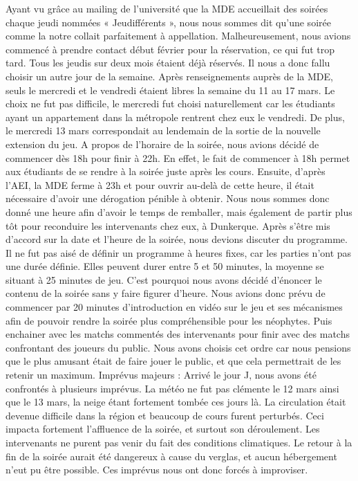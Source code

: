 Ayant vu grâce au mailing de l’université que la MDE accueillait des soirées chaque jeudi
nommées « Jeudifférents », nous nous sommes dit qu’une soirée comme la notre collait
parfaitement à appellation. Malheureusement, nous avions commencé à prendre contact
début février pour la réservation, ce qui fut trop tard. Tous les jeudis sur deux mois étaient
déjà réservés.
Il nous a donc fallu choisir un autre jour de la semaine. Après renseignements auprès de la
MDE, seuls le mercredi et le vendredi étaient libres la semaine du 11 au 17 mars. Le choix ne
fut pas difficile, le mercredi fut choisi naturellement car les étudiants ayant un appartement
dans la métropole rentrent chez eux le vendredi. De plus, le mercredi 13 mars correspondait
au lendemain de la sortie de la nouvelle extension du jeu.
A propos de l’horaire de la soirée, nous avions décidé de commencer dès 18h pour finir à
22h. En effet, le fait de commencer à 18h permet aux étudiants de se rendre à la soirée juste
après les cours. Ensuite, d’après l’AEI, la MDE ferme à 23h et pour ouvrir au-delà de cette
heure, il était nécessaire d’avoir une dérogation pénible à obtenir. Nous nous sommes donc
donné une heure afin d’avoir le temps de remballer, mais également de partir plus tôt pour
reconduire les intervenants chez eux, à Dunkerque.
Après s’être mis d’accord sur la date et l’heure de la soirée, nous devions discuter du
programme.
Il ne fut pas aisé de définir un programme à heures fixes, car les parties n’ont pas une durée
définie. Elles peuvent durer entre 5 et 50 minutes, la moyenne se situant à 25 minutes de jeu.
C’est pourquoi nous avons décidé d’énoncer le contenu de la soirée sans y faire figurer
d’heure.
Nous avions donc prévu de commencer par 20 minutes d’introduction en vidéo sur le jeu et
ses mécanismes afin de pouvoir rendre la soirée plus compréhensible pour les néophytes.
Puis enchainer avec les matchs commentés des intervenants pour finir avec des matchs
confrontant des joueurs du public. Nous avons choisis cet ordre car nous pensions que le plus
amusant était de faire jouer le public, et que cela permettrait de les retenir un maximum.
Imprévus majeurs :
Arrivé le jour J, nous avons été confrontés à plusieurs imprévus.
La météo ne fut pas clémente le 12 mars ainsi que le 13 mars, la neige étant fortement
tombée ces jours là. La circulation était devenue difficile dans la région et beaucoup de cours
furent perturbés.
Ceci impacta fortement l’affluence de la soirée, et surtout son déroulement. Les intervenants
ne purent pas venir du fait des conditions climatiques. Le retour à la fin de la soirée aurait été
dangereux à cause du verglas, et aucun hébergement n’eut pu être possible.
Ces imprévus nous ont donc forcés à improviser.

